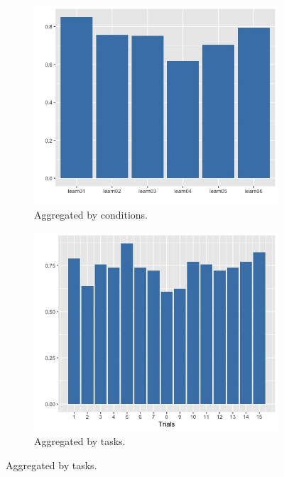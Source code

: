 \documentclass{article}
\begin{document}
\begin{figure}[h!]
  \centering
  \begin{subfigure}[t]{0.45\textwidth}
    \centering
    \includegraphics[width=\linewidth]{com_group} 
    \caption{Aggregated by conditions.}
  \end{subfigure}
  \begin{subfigure}[t]{0.45\textwidth}
    \centering
    \includegraphics[width=\linewidth]{com_trial} 
    \caption{Aggregated by tasks.}
  \end{subfigure}


\end{figure}
\end{document}

